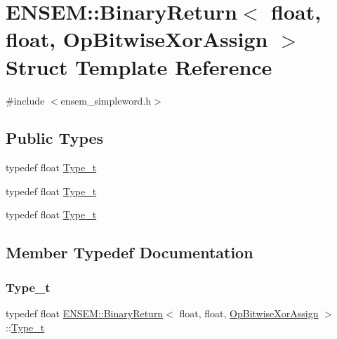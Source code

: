 \hypertarget{structENSEM_1_1BinaryReturn_3_01float_00_01float_00_01OpBitwiseXorAssign_01_4}{}\section{E\+N\+S\+EM\+:\+:Binary\+Return$<$ float, float, Op\+Bitwise\+Xor\+Assign $>$ Struct Template Reference}
\label{structENSEM_1_1BinaryReturn_3_01float_00_01float_00_01OpBitwiseXorAssign_01_4}


{\ttfamily \#include $<$ensem\+\_\+simpleword.\+h$>$}

\subsection*{Public Types}
\begin{DoxyCompactItemize}
\item 
typedef float \mbox{\hyperlink{structENSEM_1_1BinaryReturn_3_01float_00_01float_00_01OpBitwiseXorAssign_01_4_a6716df2454c53484524a0d243395b2ed}{Type\+\_\+t}}
\item 
typedef float \mbox{\hyperlink{structENSEM_1_1BinaryReturn_3_01float_00_01float_00_01OpBitwiseXorAssign_01_4_a6716df2454c53484524a0d243395b2ed}{Type\+\_\+t}}
\item 
typedef float \mbox{\hyperlink{structENSEM_1_1BinaryReturn_3_01float_00_01float_00_01OpBitwiseXorAssign_01_4_a6716df2454c53484524a0d243395b2ed}{Type\+\_\+t}}
\end{DoxyCompactItemize}


\subsection{Member Typedef Documentation}
\mbox{\label{structENSEM_1_1BinaryReturn_3_01float_00_01float_00_01OpBitwiseXorAssign_01_4_a6716df2454c53484524a0d243395b2ed}} 
\subsubsection{\texorpdfstring{Type\_t}{Type\_t}\hspace{0.1cm}{\footnotesize\ttfamily [1/3]}}
{\footnotesize\ttfamily typedef float \mbox{\hyperlink{structENSEM_1_1BinaryReturn}{E\+N\+S\+E\+M\+::\+Binary\+Return}}$<$ float, float, \mbox{\hyperlink{structENSEM_1_1OpBitwiseXorAssign}{Op\+Bitwise\+Xor\+Assign}} $>$\+::\mbox{\hyperlink{structENSEM_1_1BinaryReturn_3_01float_00_01float_00_01OpBitwiseXorAssign_01_4_a6716df2454c53484524a0d243395b2ed}{Type\+\_\+t}}}

